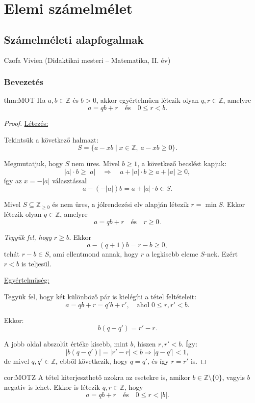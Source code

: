 \chapter{Elemi számelmélet}\label{chap:elemi_szamelmelet}
\section{Számelméleti alapfogalmak}\label{sec:szamelmelet_alapok}
\begin{description}
{\large\item [{Szerző:}] Czofa Vivien (Didaktikai mesteri -- Matematika, II. év)}
\end{description}

\subsection*{Bevezetés}
\begin{theorem}{thm:MOT}
Ha $a,b\in\mathbb{Z}$ és $b>0$, akkor egyértelműen létezik olyan
$q,r\in\mathbb{Z}$, amelyre 
\[
a=qb+r\quad\text{és}\quad0\leq r<b.
\]
\end{theorem}

\begin{proof}
\underline{Létezés:}

Tekintsük a következő halmazt: 
\[
S=\{a-xb\mid x\in\mathbb{Z},\ a-xb\geq0\}.
\]

Megmutatjuk, hogy $S$ nem üres. Mivel $b\geq1$, a következő becslést
kapjuk: 
\[
|a|\cdot b\geq|a|\quad\Rightarrow\quad a+|a|\cdot b\geq a+|a|\geq0,
\]
így az $x=-|a|$ választással 
\[
a-(-|a|)b=a+|a|\cdot b\in S.
\]

Mivel $S\subseteq\mathbb{Z}_{\geq0}$ és nem üres, a jólrendezési
elv alapján létezik $r=\min S$. Ekkor létezik olyan $q\in\mathbb{Z}$,
amelyre 
\[
a=qb+r\quad\text{és}\quad r\geq0.
\]

\textit{Tegyük fel, hogy} $r\geq b$. Ekkor 
\[
a-(q+1)b=r-b\geq0,
\]
tehát $r-b\in S$, ami ellentmond annak, hogy $r$ a legkisebb eleme
$S$-nek. Ezért $r<b$ is teljesül.

\underline{Egyértelműség:}

Tegyük fel, hogy két különböző pár is kielégíti a tétel feltételeit:
\[
a=qb+r=q'b+r',\quad\text{ahol }0\leq r,r'<b.
\]

Ekkor: 
\[
b(q-q')=r'-r.
\]

A jobb oldal abszolút értéke kisebb, mint $b$, hiszen $r,r'<b$.
Így: 
\[
|b(q-q')|=|r'-r|<b\Rightarrow|q-q'|<1,
\]
de mivel $q,q'\in\mathbb{Z}$, ebből következik, hogy $q=q'$, és
így $r=r'$ is.
\end{proof}
\begin{corollary}{cor:MOTZ}
A tétel kiterjeszthető azokra az esetekre is, amikor $b\in\mathbb{Z}\setminus\{0\}$,
vagyis $b$ negatív is lehet. Ekkor is létezik $q,r\in\mathbb{Z}$,
hogy 
\[
a=qb+r\quad\text{és}\quad0\leq r<|b|.
\]
\end{corollary}

